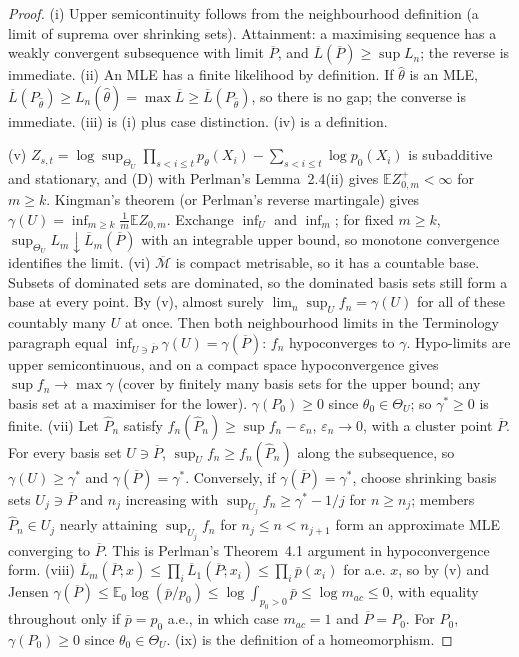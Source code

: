 \documentclass[11pt]{article}
\newcommand{\E}{\mathbb E}
\newcommand{\bM}{\overline{\mathcal M}}
\newcommand{\bP}{\overline P}
\newcommand{\bL}{\overline L}
\theoremstyle{definition}
\theoremstyle{remark}
\begin{document}
\begin{proof}
(i) Upper semicontinuity follows from the neighbourhood definition (a limit
of suprema over shrinking sets). Attainment: a maximising sequence has a
weakly convergent subsequence with limit $\bP$, and
$\bL(\bP)\ge\sup L_n$; the reverse is immediate.
(ii) An MLE has a finite likelihood by definition. If $\hat\theta$ is an
MLE, $\bL(P_{\hat\theta})\ge L_n(\hat\theta)=\max\bL\ge\bL(P_{\hat\theta})$, so
there is no gap; the converse is immediate. (iii) is (i) plus case distinction. (iv) is a definition.

(v) $Z_{s,t}=\log\sup_{\Theta_U}\prod_{s<i\le t}p_\theta(X_i)
-\sum_{s<i\le t}\log p_0(X_i)$ is subadditive and stationary, and (D) with
Perlman's Lemma~2.4(ii) gives $\E Z_{0,m}^+<\infty$ for $m\ge k$. Kingman's
theorem \cite{kingman} (or Perlman's reverse martingale) gives
$\gamma(U)=\inf_{m\ge k}\frac1m\E Z_{0,m}$. Exchange $\inf_U$ and $\inf_m$;
for fixed $m\ge k$, $\sup_{\Theta_U}L_m\downarrow\bL_m(\bP)$ with an integrable
upper bound, so monotone convergence identifies the limit.
(vi) $\bM$ is compact metrisable, so it has a countable base. Subsets of
dominated sets are dominated, so the dominated basis sets still form a base
at every point. By (v), almost surely
$\lim_n\sup_Uf_n=\gamma(U)$ for all of these countably many $U$ at once.
Then both neighbourhood limits in the Terminology paragraph equal
$\inf_{U\ni\bP}\gamma(U)=\gamma(\bP)$: $f_n$ hypoconverges to $\gamma$.
Hypo-limits are upper semicontinuous, and on a compact space
hypoconvergence gives $\sup f_n\to\max\gamma$ (cover by finitely many
basis sets for the upper bound; any basis set at a maximiser for the
lower). $\gamma(P_0)\ge0$ since $\theta_0\in\Theta_U$; so $\gamma^*\ge0$ is
finite.
(vii) Let $\hat P_n$ satisfy $f_n(\hat P_n)\ge\sup f_n-\varepsilon_n$,
$\varepsilon_n\to0$, with a cluster point $\bP$. For every basis set
$U\ni\bP$, $\sup_Uf_n\ge f_n(\hat P_n)$ along the subsequence, so
$\gamma(U)\ge\gamma^*$ and $\gamma(\bP)=\gamma^*$. Conversely, if
$\gamma(\bP)=\gamma^*$, choose shrinking basis sets $U_j\ni\bP$ and $n_j$
increasing with $\sup_{U_j}f_n\ge\gamma^*-1/j$ for $n\ge n_j$; members
$\hat P_n\in U_j$ nearly attaining $\sup_{U_j}f_n$ for $n_j\le n<n_{j+1}$
form an approximate MLE converging to $\bP$. This is Perlman's
Theorem~4.1 argument in hypoconvergence form.
(viii) $\bL_m(\bP;x)\le\prod_i\bL_1(\bP;x_i)\le\prod_i\bar p(x_i)$ for a.e.
$x$, so by (v) and Jensen
$\gamma(\bP)\le\E_0\log(\bar p/p_0)\le\log\int_{p_0>0}\bar p\le\log m_{ac}\le0$,
with equality throughout only if $\bar p=p_0$ a.e., in which case
$m_{ac}=1$ and $\bP=P_0$. For $P_0$, $\gamma(P_0)\ge0$ since
$\theta_0\in\Theta_U$. (ix) is the definition of a homeomorphism.
\end{proof}
\end{document}

